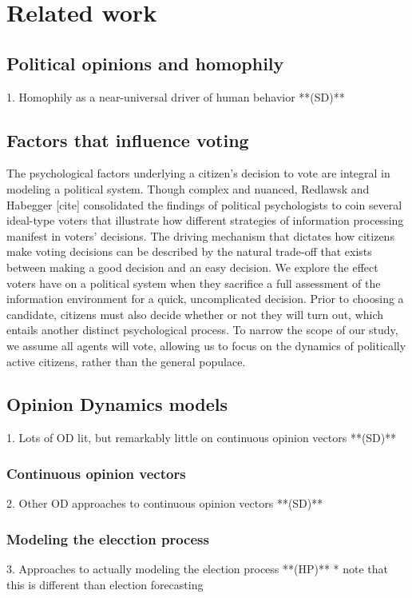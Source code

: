 \section{Related work}
\label{sec:related}

\subsection{Political opinions and homophily}
    1. Homophily as a near-universal driver of human behavior **(SD)**

\subsection{Factors that influence voting}
The psychological factors underlying a citizen’s decision to vote 
are integral in modeling a political system. Though complex and nuanced, Redlawsk 
and Habegger [cite] consolidated the findings of political psychologists to coin 
several ideal-type voters that illustrate how different strategies of information 
processing manifest in voters’ decisions. The driving mechanism that dictates how 
citizens make voting decisions can be described by the natural trade-off that exists between making 
a good decision and an easy decision. We explore the effect voters have on a political 
system when they sacrifice a full assessment of the information environment for a 
quick, uncomplicated decision. 
Prior to choosing a candidate, citizens must also 
decide whether or not they will turn out, which entails another distinct psychological 
process. To narrow the scope of our study, we assume all agents will vote, allowing 
us to focus on the dynamics of politically active citizens, rather than the general 
populace.

\subsection{Opinion Dynamics models}
    1. Lots of OD lit, but remarkably little on continuous opinion vectors **(SD)**

\subsubsection{Continuous opinion vectors}
    2. Other OD approaches to continuous opinion vectors **(SD)**

\subsubsection{Modeling the elecction process}
    3. Approaches to actually modeling the election process **(HP)**
        * note that this is different than election forecasting


